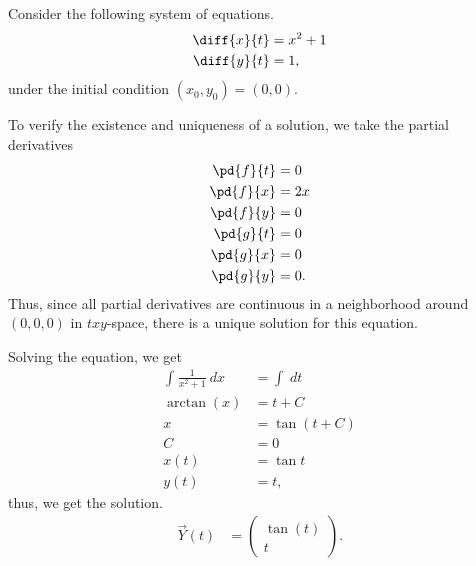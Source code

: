\documentclass[10pt]{mypackage}
\begin{document}
\begin{example}
  Consider the following system of equations.
  \begin{align*}
    \diff{x}{t} &= x^2 + 1\\
    \diff{y}{t} &= 1,
  \end{align*}
  under the initial condition $\left(x_0,y_0\right) = \left(0,0\right)$.\newline

  To verify the existence and uniqueness of a solution, we take the partial derivatives
  \begin{align*}
    \pd{f}{t} &= 0\\
    \pd{f}{x} &= 2x\\
    \pd{f}{y} &= 0\\
    \pd{g}{t} &= 0\\
    \pd{g}{x} &= 0\\
    \pd{g}{y} &= 0.
  \end{align*}
  Thus, since all partial derivatives are continuous in a neighborhood around $(0,0,0)$ in $txy$-space, there is a unique solution for this equation.\newline

  Solving the equation, we get
  \begin{align*}
    \int_{}^{} \frac{1}{x^2 + 1}\:dx &= \int_{}^{} \:dt\\
    \arctan(x) &= t + C\\
    x &= \tan \left(t+C\right)\\
    C &= 0\\
    x(t) &= \tan t\\
    y(t) &= t,
  \end{align*}
  thus, we get the solution.
  \begin{align*}
    \vec{Y}(t) &= \begin{pmatrix}\tan(t)\\t\end{pmatrix}.
  \end{align*}
\end{example}
\end{document}
